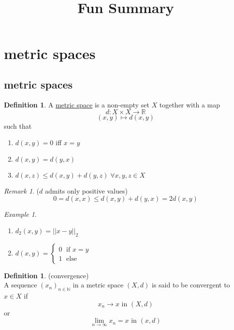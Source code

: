 \documentclass[a4paper, 12pt]{article}
\theoremstyle{plain}
\theoremstyle{definition}
\newtheorem{definition}[theorem]{Definition} %
\theoremstyle{lemma}
\theoremstyle{remark}
\newtheorem{remark}[theorem]{Remark}
\theoremstyle{corollary}
\theoremstyle{example}
\newtheorem{example}[theorem]{Example}
\begin{document}
	\begin{titlepage} 
		\title{Fun Summary}
		\clearpage\maketitle
		\thispagestyle{empty}
	\end{titlepage}
	\tableofcontents
	\newpage
	\section{metric spaces}
	\label{sec: metric spaces}
	\subsection{metric spaces}
	\begin{definition}
		A \underline{metric space} is a non-empty set $X$ together with a map \[d: X \times X \to \mathbb{R}\]
		\[(x,y) \mapsto d(x,y)\]
		such that \begin{enumerate}
			\item $d(x,y) = 0$ iff $x = y$
			\item $d(x,y) = d(y,x)$
			\item $d(x,z) \leq d(x,y) + d(y,z) \; \forall x,y,z \in X$
		\end{enumerate}
	\end{definition}
	
	\begin{remark}($d$ admits only positive values)\\
		\[0 = d(x,x) \leq d(x,y) + d(y,x) = 2d(x,y)\]
	\end{remark}
	
	\begin{example}
		\begin{enumerate}
			\item $d_2(x,y) = ||x-y||_2$
			\item $d(x,y) = \begin{cases}
				0 \; \text{ if } x = y\\
				1 \; \text{ else}
			\end{cases}$
		\end{enumerate}
	\end{example}
	
	\begin{definition} (convergence)\\
		A sequence $(x_n)_{n \in \mathbb{N}}$ in a metric space $(X,d)$ is said to be convergent to $x \in X$ if \[x_n \to x \text{ in } (X,d)\] or \[\lim\limits_{n \to \infty} x_n = x \text{ in } (x,d)\]
	\end{definition}
	
\end{document}
